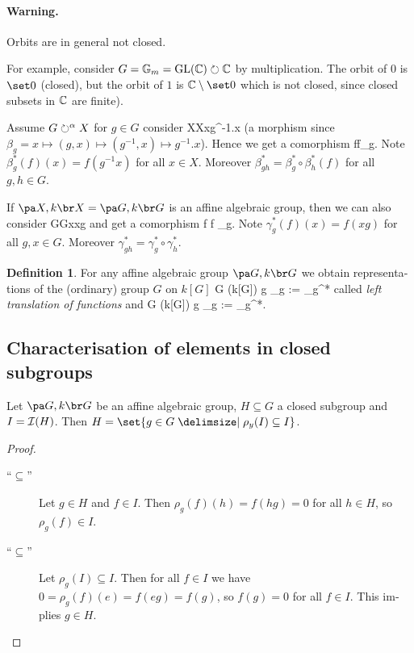 \documentclass[12pt,a4paper]{scrartcl}
\theoremstyle{cplain}
\theoremstyle{cplain}
\theoremstyle{cplain}
\theoremstyle{definition}
\newtheorem*{deff}{Definition}
\begin{document}
\begin{otherlanguage}{english}
\paragraph{Warning.}
Orbits are in general not closed.

For example, consider $G = \mathbb G_m = \operatorname{GL}(\mathbb C) \circlearrowright \mathbb C$ by multiplication. The orbit of $0$ is $\set 0$ (closed), but the orbit of $1$ is $\IC\setminus \set 0$ which is not closed, since closed subsets in $\mathbb C$ are finite).

\bigskip

Assume $G \circlearrowright^\alpha X$ for $g \in G$ consider XXx{g^{-1}.x} (a morphism since $\beta_g = x \mapsto (g,x) \mapsto (g^{-1},x) \mapsto g^{-1}.x$). Hence we get a comorphism f{f\circ \beta_g.} Note $\beta_g^*(f)(x) = f(g^{-1}x)$ for all $x \in X$. Moreover $\beta_{gh}^* = \beta_g^* \circ \beta_h^*(f)$ for all $g,h \in G$.

If $\aav X = \aav G$ is an affine algebraic group, then we can also consider  GGx{xg} and get a comorphism  f {f \circ \gamma_g.} Note $\gamma_g^*(f)(x) = f(xg)$ for all $g,x\in G$. Moreover $\gamma_{gh}^* = \gamma_g^* \circ \gamma_h^*$.
\begin{deff}
  For any affine algebraic group $\aav G$ we obtain representations of the (ordinary) group $G$ on $k[G]$ \blockeq \lambda G {\GL(k[G])} g {\lambda_g := \beta_g^*} called \emph{left translation of functions} and \blockeq \rho G {\GL(k[G])} g {\rho_g := \gamma_g^*.}
\end{deff}

\subsection{Characterisation of elements in closed subgroups}
\begin{lem}
  Let $\aav G$ be an affine algebraic group, $H\subseteq G$ a closed subgroup and $I = \mathcal{I}(H)$. Then $H = \set{g\in G \given \rho_y(I) \subseteq I}$.
\end{lem}
\begin{proof}
  \leavevmode
  \begin{description}
  \item[\enquote{$\subseteq$}] Let $g\in H$ and $f\in I$. Then $\rho_g(f)(h) = f(hg) = 0$ for all $h\in H$, so $\rho_g(f) \in I$.
  \item[\enquote{$\subseteq$}] Let $\rho_g(I) \subseteq I$. Then for all $f\in I$ we have $0 = \rho_g(f)(e) = f(eg) = f(g)$, so $f(g) = 0$ for all $f\in I$. This implies $g \in H$. %
  \end{description}
\end{proof}


\end{otherlanguage}
\end{document}

